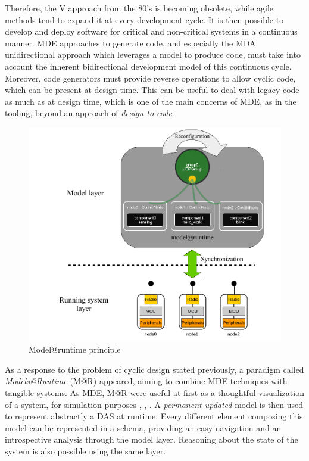 Therefore, the V approach from the 80's is becoming obsolete, while agile methods tend to expand it at every development cycle.
It is then possible to develop and deploy software for critical and non-critical systems in a continuous manner.
MDE approaches to generate code, and especially the MDA unidirectional approach which leverages a model to produce code, must take into account the inherent bidirectional development model of this continuous cycle.
Moreover, code generators must provide reverse operations to allow cyclic code, which can be present at design time.
This can be useful to deal with legacy code as much as at design time, which is one of the main concerns of MDE, as in the tooling, beyond an approach of \textit{design-to-code}.

\begin{figure}[htb]
	\centering
	\includegraphics[width=1\columnwidth]{chapters/stateOfTheArt.images/modelsAtRuntime.pdf}
	\caption{Model@runtime principle \label{fig:MAROverview}} 
\end{figure}

As a response to the problem of cyclic design stated previously, a paradigm called \textit{Models@Runtime} (M@R) appeared, aiming to combine MDE techniques with tangible systems.
As MDE, M@R were useful at first as a thoughtful visualization of a system, for simulation purposes \cite{oreizy1999architecture},  \cite{blair2009models},  \cite{zhang2006model}.
A \textit{permanent updated} model is then used to represent abstractly a DAS at runtime.
Every different element composing this model can be represented in a schema, providing an easy navigation and an introspective analysis through the model layer.
Reasoning about the state of the system is also possible using the same layer.

